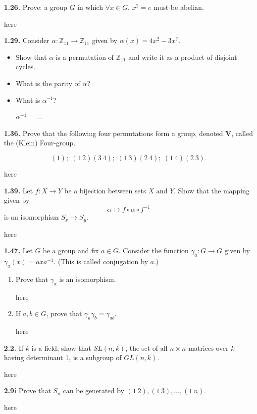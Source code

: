 \documentclass[12pt]{article}
\newcommand{\zee}{\mathbb{Z}}
\begin{document}
\textbf{1.26.} Prove: a group $G$ in which $\forall x\in G$, $x^2=e$ must be abelian.

\bigskip

here

\vspace{1in}

\textbf{1.29.} Consider $\alpha: \zee_{11}\to \zee_{11}$ given by $\alpha(x)=4x^2-3x^7$.
\begin{itemize}
	\item Show that $\alpha$ is a permutation of $\zee_{11}$ and write it as a product of disjoint cycles.

	\bigskip

	\item What is the parity of $\alpha$?

	\bigskip

	\item What is $\alpha^{-1}$?

	\bigskip

	$\alpha^{-1}=...$.
\end{itemize}


\textbf{1.36.} Prove that the following four permutations form a group, denoted $\mathbf{V}$, called the (Klein) Four-group.

\[(1);\; (1\ 2)(3\ 4);\; (1\ 3)(2\ 4);\; (1\ 4)(2\ 3).\]


\bigskip

here

\vspace{1in}


\textbf{1.39.} Let $f : X\to Y$ be a bijection between sets $X$ and $Y$. Show that the mapping given by \[\alpha \mapsto f\circ\alpha\circ f^{-1}\] is an isomorphism $S_x\to S_y$.


\bigskip

here

\vspace{1in}

\textbf{1.47.} Let $G$ be a group and fix $a\in G$. Consider the function $\gamma_a: G\to G$ given by $\gamma_a(x)=axa^{-1}$. (This is called conjugation by $a$.)
\begin{enumerate}[(i.)]
	\item Prove that $\gamma_a$ is an isomorphism.

	\bigskip

here

\vspace{1in}

	\item If $a,b\in G$, prove that $\gamma_a\gamma_b=\gamma_{ab}$.

	\bigskip

here

\vspace{1in}
\end{enumerate}



\textbf{2.2.} If $k$ is a field, show that $SL(n,k)$, the set of all $n\times n$ matrices over $k$ having determinant 1, is a subgroup of $GL(n,k)$.

\bigskip

here

\vspace{1in}

\textbf{2.9i} Prove that $S_n$ can be generated by $(1\ 2), (1\ 3),\dotsc, (1\ n).$

\bigskip

here

\vspace{1in}
\end{document}
